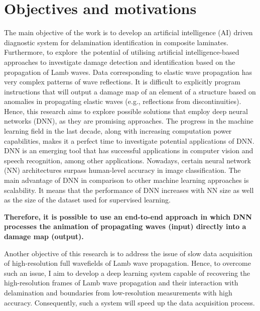 \section{Objectives and motivations}
\label{sec13}

The main objective of the work is to develop an artificial intelligence (AI) driven diagnostic system for delamination identification in composite laminates.
Furthermore, to explore the potential of utilising artificial intelligence-based approaches to investigate damage detection and identification based on the propagation of Lamb waves.
Data corresponding to elastic wave propagation has very complex patterns of wave reflections. 
It is difficult to explicitly program instructions that will output a damage map of an element of a structure based on anomalies in propagating elastic waves (e.g., reflections from discontinuities).
Hence, this research aims to explore possible solutions that employ deep neural networks (DNN), as they are promising approaches.
The progress in the machine learning field in the last decade, along with increasing computation power capabilities, makes it a perfect time to investigate potential applica\-tions of DNN. 
DNN is an emerging tool that has successful applications in computer vision and speech recognition, among other applications. 
Nowadays, certain neural network (NN) architectures surpass human-level accuracy in image classification. 
The main advantage of DNN in comparison to other machine learning approaches is scalability. 
It means that the performance of DNN increases with NN size as well as the size of the dataset used for supervised learning.

\textbf{Therefore, it is possible to use an end-to-end approach in which DNN processes the animation of propagating waves (input) directly into a damage map (output).}

Another objective of this research is to address the issue of slow data acquisition of high-resolution full wavefields of Lamb wave propagation.
Hence, to overcome such an issue, I aim to develop a deep learning system capable of recovering the high-resolution frames of Lamb wave propagation and their interaction with delamination and boundaries from low-resolution measurements with high accuracy.
Consequently, such a system will speed up the data acquisition process.


